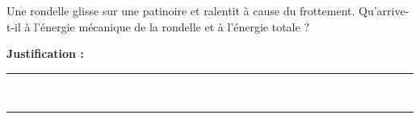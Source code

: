 Une rondelle glisse sur une patinoire et ralentit à cause du frottement. Qu'arrive-t-il à l'énergie mécanique de la rondelle et à l'énergie totale ?

\choices

\noindent\textbf{Justification :} \hrulefill \\[2.5ex]
\rule{\linewidth}{0.4pt} \\[2.5ex]
\rule{\linewidth}{0.4pt}
\vfill
